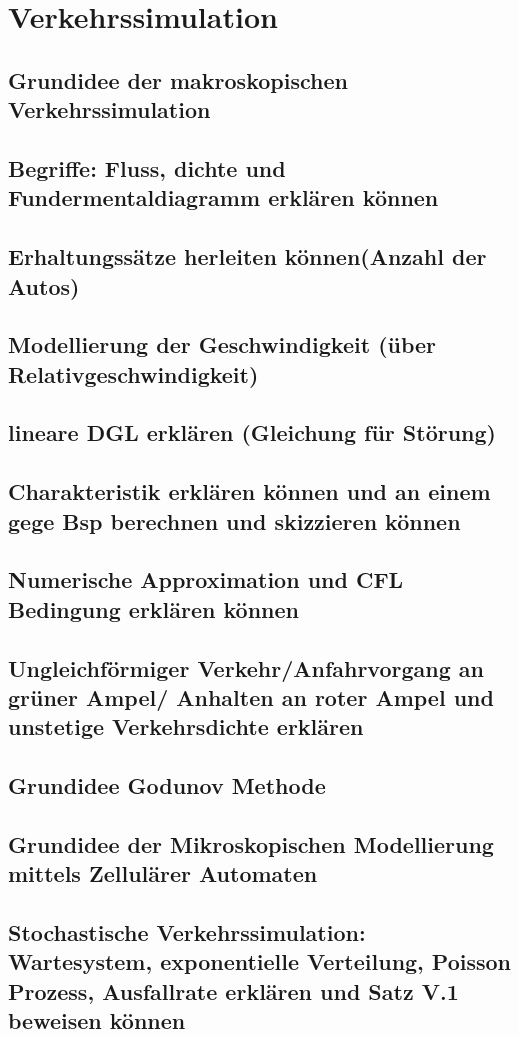 \documentclass[]{article}
\begin{document}
\section{Verkehrssimulation}

\subsection*{Grundidee der makroskopischen Verkehrssimulation}

\subsection*{Begriffe: Fluss, dichte und Fundermentaldiagramm erklären können}

\subsection*{Erhaltungssätze herleiten können(Anzahl der Autos)}

\subsection*{Modellierung der Geschwindigkeit (über Relativgeschwindigkeit)}

\subsection*{lineare DGL erklären (Gleichung für Störung)}

\subsection*{Charakteristik erklären können und an einem gege Bsp berechnen und skizzieren können}

\subsection*{Numerische Approximation und CFL Bedingung erklären können}

\subsection*{Ungleichförmiger Verkehr/Anfahrvorgang an grüner Ampel/ Anhalten an roter Ampel und unstetige Verkehrsdichte erklären}

\subsection*{Grundidee Godunov Methode}

\subsection*{Grundidee der Mikroskopischen Modellierung mittels Zellulärer Automaten}

\subsection{Stochastische Verkehrssimulation: Wartesystem, exponentielle Verteilung, Poisson Prozess, Ausfallrate erklären und Satz V.1 beweisen können}
\end{document}
